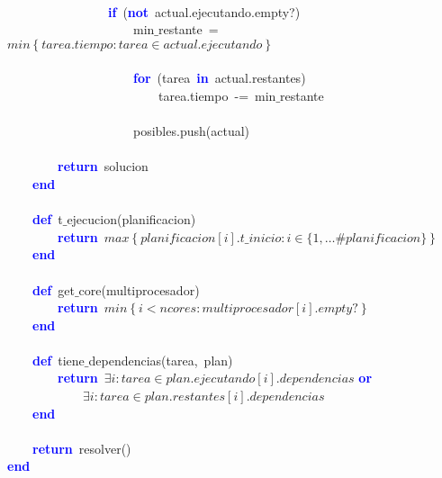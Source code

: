 \mbox{} \\
\mbox{}\ \ \ \ \ \ \ \ \ \ \ \ \ \ \ \ \textbf{\textcolor{Blue}{if}}\ \textcolor{BrickRed}{(}\textbf{\textcolor{Blue}{not}}\ actual\textcolor{BrickRed}{.}ejecutando\textcolor{BrickRed}{.}empty?\textcolor{BrickRed}{)} \\
\mbox{}\ \ \ \ \ \ \ \ \ \ \ \ \ \ \ \ \ \ \ \ min$\_$restante\ \textcolor{BrickRed}{=}\ $min\left\{tarea.tiempo: tarea \in actual.ejecutando\right\}$ \\
\mbox{} \\
\mbox{}\ \ \ \ \ \ \ \ \ \ \ \ \ \ \ \ \ \ \ \ \textbf{\textcolor{Blue}{for}}\ \textcolor{BrickRed}{(}tarea\ \textbf{\textcolor{Blue}{in}}\ actual\textcolor{BrickRed}{.}restantes\textcolor{BrickRed}{)} \\
\mbox{}\ \ \ \ \ \ \ \ \ \ \ \ \ \ \ \ \ \ \ \ \ \ \ \ tarea\textcolor{BrickRed}{.}tiempo\ \textcolor{BrickRed}{-=}\ min$\_$restante \\
\mbox{} \\
\mbox{}\ \ \ \ \ \ \ \ \ \ \ \ \ \ \ \ \ \ \ \ posibles\textcolor{BrickRed}{.}push\textcolor{BrickRed}{(}actual\textcolor{BrickRed}{)} \\
\mbox{} \\
\mbox{}\ \ \ \ \ \ \ \ \textbf{\textcolor{Blue}{return}}\ solucion \\
\mbox{}\ \ \ \ \textbf{\textcolor{Blue}{end}} \\
\mbox{} \\
\mbox{}\ \ \ \ \textbf{\textcolor{Blue}{def}}\ t$\_$ejecucion\textcolor{BrickRed}{(}planificacion\textcolor{BrickRed}{)} \\
\mbox{}\ \ \ \ \ \ \ \ \textbf{\textcolor{Blue}{return}}\ $max\left\{ planificacion[i].t\_inicio : i \in \{1, \dots \#planificacion \} \right\}$ \\
\mbox{}\ \ \ \ \textbf{\textcolor{Blue}{end}} \\
\mbox{} \\
\mbox{}\ \ \ \ \textbf{\textcolor{Blue}{def}}\ get$\_$core\textcolor{BrickRed}{(}multiprocesador\textcolor{BrickRed}{)} \\
\mbox{}\ \ \ \ \ \ \ \ \textbf{\textcolor{Blue}{return}}\ $min\left\{i < ncores : multiprocesador[i].empty? \right\}$ \\
\mbox{}\ \ \ \ \textbf{\textcolor{Blue}{end}} \\
\mbox{} \\
\mbox{}\ \ \ \ \textbf{\textcolor{Blue}{def}}\ tiene$\_$dependencias\textcolor{BrickRed}{(}tarea\textcolor{BrickRed}{,}\ plan\textcolor{BrickRed}{)} \\
\mbox{}\ \ \ \ \ \ \ \ \textbf{\textcolor{Blue}{return}}\ $\exists i : tarea \in plan.ejecutando[i].dependencias$ \textbf{\textcolor{Blue}{or}} \\
\mbox{}\ \ \ \ \ \ \ \ \ \ \ \ $\exists i : tarea \in plan.restantes[i].dependencias$ \\
\mbox{}\ \ \ \ \textbf{\textcolor{Blue}{end}} \\
\mbox{} \\
\mbox{}\ \ \ \ \textbf{\textcolor{Blue}{return}}\ resolver\textcolor{BrickRed}{()} \\
\mbox{}\textbf{\textcolor{Blue}{end}} \\
\mbox{}
